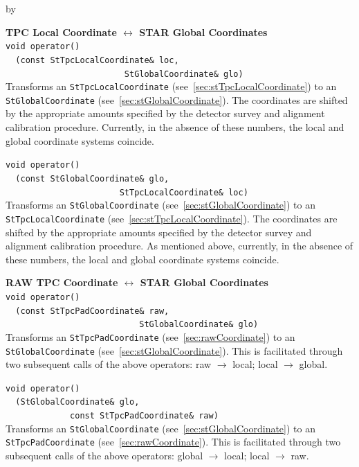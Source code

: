 \documentclass[twoside]{article}
\newcommand{\comp}[1]{\texttt{#1}}%
\newcommand{\entrylabel}[1]{\mbox{\textbf{{#1}}}\hfil}%
\newenvironment{entry}
{\begin{list}{}%
    {\renewcommand{\makelabel}{\entrylabel}%
     \setlength{\labelwidth}{90pt}%
     \setlength{\leftmargin}{\labelwidth}
     \advance\leftmargin by \labelsep%
      }%
    }%
  {\end{list}}
\newcommand{\Entrylabel}[1]%
{\raisebox{0pt}[1ex][0pt]{\makebox[\labelwidth][l]%
    {\parbox[t]{\labelwidth}{\hspace{0pt}\textbf{{#1}}}}}}
\newenvironment{Entry}%
{\renewcommand{\entrylabel}{\Entrylabel}\begin{entry}}%
  {\end{entry}}
\begin{document}
\begin{Entry}
   {\bf TPC Local Coordinate $\leftrightarrow$ STAR Global Coordinates} \\
   \verb+void operator()+\\
   \verb+  (const StTpcLocalCoordinate& loc,+\\
   \verb+                        StGlobalCoordinate& glo)+\\
   Transforms an \comp{StTpcLocalCoordinate} (see~\ref{sec:stTpcLocalCoordinate})
   to an \comp{StGlobalCoordinate} (see~\ref{sec:stGlobalCoordinate}).  The
   coordinates are shifted by the appropriate amounts specified by the
   detector survey and alignment calibration procedure.  Currently, in
   the absence of these numbers, the local and global coordinate systems
   coincide.

   \verb+void operator()+\\
   \verb+  (const StGlobalCoordinate& glo,+\\
   \verb+                       StTpcLocalCoordinate& loc)+\\
   Transforms an \comp{StGlobalCoordinate} (see~\ref{sec:stGlobalCoordinate})
   to an \comp{StTpcLocalCoordinate} (see~\ref{sec:stTpcLocalCoordinate}).
   The coordinates are shifted by the appropriate amounts specified by the
   detector survey and alignment calibration procedure.  
   As mentioned above, currently, in the absence of these numbers, the 
   local and global coordinate systems coincide.

   {\bf RAW TPC Coordinate $\leftrightarrow$ STAR Global Coordinates} \\
   \verb+void operator()+\\
   \verb+  (const StTpcPadCoordinate& raw,+\\
   \verb+                           StGlobalCoordinate& glo)+\\
   Transforms an \comp{StTpcPadCoordinate} (see~\ref{sec:rawCoordinate})
   to an \comp{StGlobalCoordinate} (see~\ref{sec:stGlobalCoordinate}).  This
   is facilitated through two subsequent calls of the above
   operators: raw $\rightarrow$ local; local $\rightarrow$ global.

   \verb+void operator()+\\
   \verb+  (StGlobalCoordinate& glo,+\\
   \verb+             const StTpcPadCoordinate& raw)+\\
   Transforms an \comp{StGlobalCoordinate} (see~\ref{sec:stGlobalCoordinate})
   to an \comp{StTpcPadCoordinate} (see~\ref{sec:rawCoordinate}).  This
   is facilitated through two subsequent calls of the above
   operators: global $\rightarrow$ local; local $\rightarrow$ raw.



\end{Entry}
\end{document}
